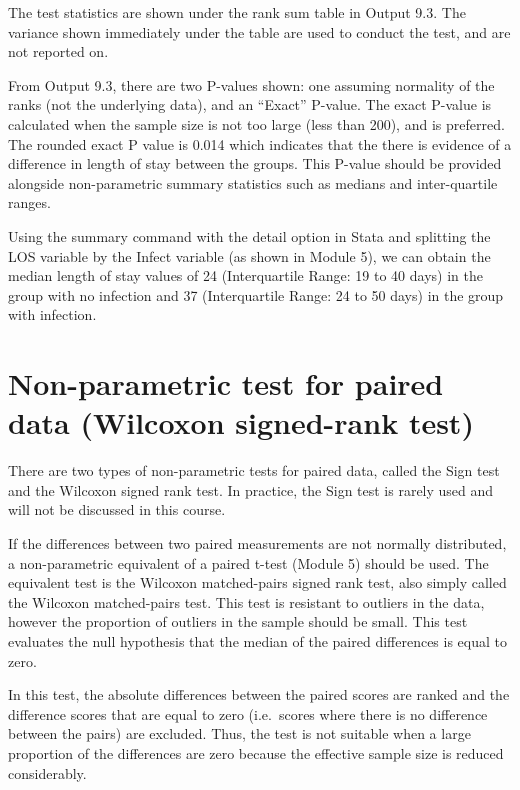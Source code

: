 \documentclass[
]{memoir}
\begin{document}
The test statistics are shown under the rank sum table in Output 9.3. The variance shown immediately under the table are used to conduct the test, and are not reported on.

From Output 9.3, there are two P-values shown: one assuming normality of the ranks (not the underlying data), and an ``Exact'' P-value. The exact P-value is calculated when the sample size is not too large (less than 200), and is preferred. The rounded exact P value is 0.014 which indicates that the there is evidence of a difference in length of stay between the groups. This P-value should be provided alongside non-parametric summary statistics such as medians and inter-quartile ranges.

Using the summary command with the detail option in Stata and splitting the LOS variable by the Infect variable (as shown in Module 5), we can obtain the median length of stay values of 24 (Interquartile Range: 19 to 40 days) in the group with no infection and 37 (Interquartile Range: 24 to 50 days) in the group with infection.

\hypertarget{non-parametric-test-for-paired-data-wilcoxon-signed-rank-test}{%
\section{Non-parametric test for paired data (Wilcoxon signed-rank test)}\label{non-parametric-test-for-paired-data-wilcoxon-signed-rank-test}}

There are two types of non-parametric tests for paired data, called the Sign test and the Wilcoxon signed rank test. In practice, the Sign test is rarely used and will not be discussed in this course.

If the differences between two paired measurements are not normally distributed, a non-parametric equivalent of a paired t-test (Module 5) should be used. The equivalent test is the Wilcoxon matched-pairs signed rank test, also simply called the Wilcoxon matched-pairs test. This test is resistant to outliers in the data, however the proportion of outliers in the sample should be small. This test evaluates the null hypothesis that the median of the paired differences is equal to zero.

In this test, the absolute differences between the paired scores are ranked and the difference scores that are equal to zero (i.e.~scores where there is no difference between the pairs) are excluded. Thus, the test is not suitable when a large proportion of the differences are zero because the effective sample size is reduced considerably.
\end{document}

